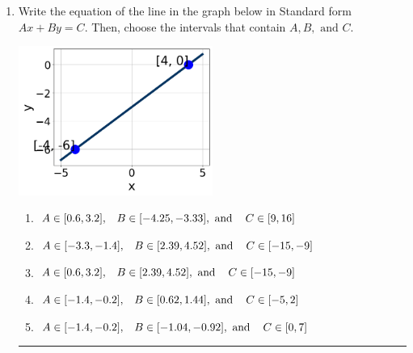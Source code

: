 \documentclass[14pt]{extbook}
\newcommand{\litem}[1]{\item#1\hspace*{-1cm}\rule{\textwidth}{0.4pt}}
\begin{document}
\begin{enumerate}
{\begin{enumerate}[label=\Alph*.]
\end{enumerate} }
\litem{
Write the equation of the line in the graph below in Standard form $Ax+By=C$. Then, choose the intervals that contain $A, B, \text{ and } C$.
\begin{center}
    \includegraphics[width=0.5\textwidth]{../Figures/linearGraphToStandardCopyB.png}
\end{center}
\begin{enumerate}[label=\Alph*.]
\item \( A \in [0.6, 3.2], \hspace{3mm} B \in [-4.25, -3.33], \text{ and } \hspace{3mm} C \in [9, 16] \)
\item \( A \in [-3.3, -1.4], \hspace{3mm} B \in [2.39, 4.52], \text{ and } \hspace{3mm} C \in [-15, -9] \)
\item \( A \in [0.6, 3.2], \hspace{3mm} B \in [2.39, 4.52], \text{ and } \hspace{3mm} C \in [-15, -9] \)
\item \( A \in [-1.4, -0.2], \hspace{3mm} B \in [0.62, 1.44], \text{ and } \hspace{3mm} C \in [-5, 2] \)
\item \( A \in [-1.4, -0.2], \hspace{3mm} B \in [-1.04, -0.92], \text{ and } \hspace{3mm} C \in [0, 7] \)


\end{enumerate}}
\end{enumerate}
\end{document}

